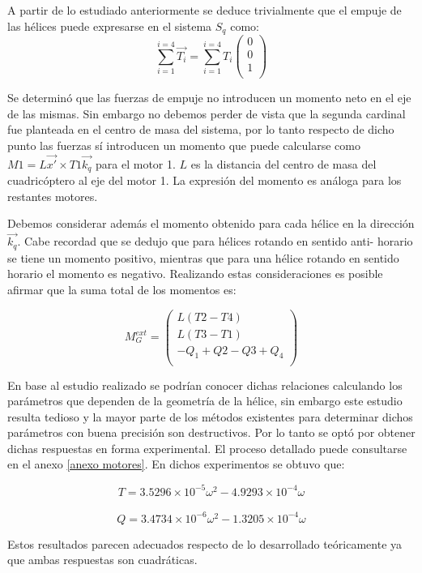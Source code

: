 \documentclass[main]{subfiles}
\begin{document}
A partir de lo estudiado anteriormente se deduce trivialmente que el empuje de las h\'elices puede expresarse en el sistema $S_q$ como:
$$
\sum_{i=1}^{i=4} \vec{T_i} =\sum_{i=1}^{i=4}T_i\left(\begin{array}{c}
0\\
0\\
1\\
\end{array} \right)
$$

Se determin\'o que las fuerzas de empuje no introducen un momento neto en el eje de las mismas. Sin embargo no debemos perder de vista que la segunda cardinal fue planteada en el centro de masa del sistema, por lo tanto respecto de dicho punto las fuerzas s\'i introducen un momento que puede calcularse como $M1=L\vec{x\prime} \times T1\vec{k_q}$ para el motor 1. $L$ es la distancia del centro de masa del cuadric\'optero al eje del motor 1. La expresi\'on del momento es an\'aloga para los restantes motores.

Debemos considerar adem\'as el momento obtenido para cada h\'elice en la direcci\'on $\vec{k_q}$. Cabe recordad que se dedujo que para h\'elices rotando en sentido anti- horario se tiene un momento positivo, mientras que para una h\'elice rotando en sentido horario el momento es negativo. Realizando estas consideraciones es posible afirmar que la suma total de los momentos es:

$$M_G^{ext} = \left(\begin{array}{c}
L(T2-T4)\\
L(T3-T1)\\
-Q_1+Q2-Q3+Q_4\\
\end{array} \right)$$

En base al estudio realizado se podr\'ian conocer dichas relaciones calculando los par\'ametros que dependen de la geometr\'ia de la h\'elice, sin embargo este estudio resulta tedioso y la mayor parte de los m\'etodos existentes para determinar dichos par\'ametros con buena precisi\'on son destructivos. Por lo tanto se opt\'o por obtener dichas respuestas en forma experimental. El proceso detallado puede consultarse en el anexo \ref{anexo motores}. En dichos experimentos se obtuvo que:

$$
T=3.5296\times 10^{-5}\omega^2-4.9293\times 10^{-4}\omega
$$\\$$Q= 3.4734\times 10^{-6}\omega^2-1.3205\times 10^{-4}\omega $$

Estos resultados parecen adecuados respecto de lo desarrollado te\'oricamente ya que ambas respuestas son cuadr\'aticas. 
\end{document}
